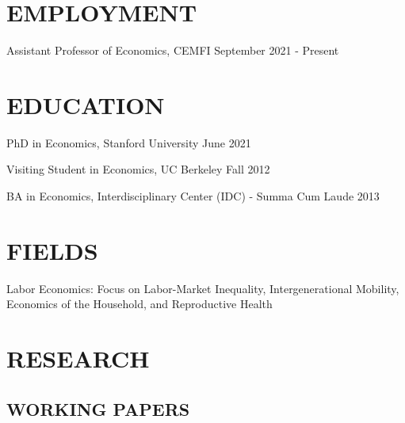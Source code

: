 \documentclass[margin]{res} %
\begin{document}
\begin{resume}


\section{EMPLOYMENT}

Assistant Professor of Economics, CEMFI \hfill September 2021 - Present


\section{EDUCATION}

PhD in Economics, Stanford University \hfill June 2021

Visiting Student in Economics, UC Berkeley  \hfill Fall 2012 

BA in Economics, Interdisciplinary Center (IDC) - Summa Cum Laude \hfill 2013

 
\section{FIELDS}  
 Labor Economics: Focus on Labor-Market Inequality, Intergenerational Mobility, Economics of the Household, and Reproductive Health
 

\section{ RESEARCH} 

\subsection{WORKING PAPERS}


\end{resume}
\end{document}
